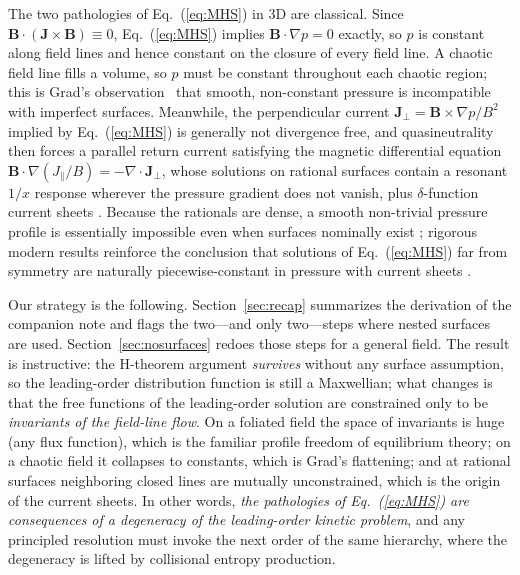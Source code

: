 \documentclass[english]{article}
\newcommand{\bB}{\mathbf{B}}
\newcommand{\bJ}{\mathbf{J}}
\begin{document}
The two pathologies of Eq.~(\ref{eq:MHS}) in 3D are classical. Since
$\bB\cdot(\bJ\times\bB)\equiv0$, Eq.~(\ref{eq:MHS}) implies $\bB\cdot\nabla p=0$ exactly, so $p$
is constant along field lines and hence constant on the closure of every field line. A chaotic
field line fills a volume, so $p$ must be constant throughout each chaotic region; this is Grad's
observation~\cite{grad1967} that smooth, non-constant pressure is incompatible with imperfect
surfaces. Meanwhile, the perpendicular current $\bJ_\perp=\bB\times\nabla p/B^2$ implied by
Eq.~(\ref{eq:MHS}) is generally not divergence free, and quasineutrality then forces a parallel
return current satisfying the magnetic differential equation
$\bB\cdot\nabla(J_\parallel/B)=-\nabla\cdot\bJ_\perp$, whose solutions on rational surfaces contain
a resonant $1/x$ response wherever the pressure gradient does not vanish, plus $\delta$-function
current sheets \cite{newcomb1959,boozer1981,loizu2015a,loizu2015b,helander2014}. Because the
rationals are dense, a smooth non-trivial pressure profile is essentially impossible even when
surfaces nominally exist \cite{boozer1981,grad1967}; rigorous modern results reinforce the
conclusion that solutions of Eq.~(\ref{eq:MHS}) far from symmetry are naturally piecewise-constant
in pressure with current sheets \cite{bruno1996,enciso2025,constantin2021}.

Our strategy is the following. Section~\ref{sec:recap} summarizes the derivation of the companion
note and flags the two---and only two---steps where nested surfaces are used.
Section~\ref{sec:nosurfaces} redoes those steps for a general field. The result is instructive: the
H-theorem argument \emph{survives} without any surface assumption, so the leading-order
distribution function is still a Maxwellian; what changes is that the free functions of the
leading-order solution are constrained only to be \emph{invariants of the field-line flow}. On a
foliated field the space of invariants is huge (any flux function), which is the familiar profile
freedom of equilibrium theory; on a chaotic field it collapses to constants, which is Grad's
flattening; and at rational surfaces neighboring closed lines are mutually unconstrained, which is
the origin of the current sheets. In other words, \emph{the pathologies of Eq.~(\ref{eq:MHS}) are
consequences of a degeneracy of the leading-order kinetic problem}, and any principled resolution
must invoke the next order of the same hierarchy, where the degeneracy is lifted by collisional
entropy production.
\end{document}
